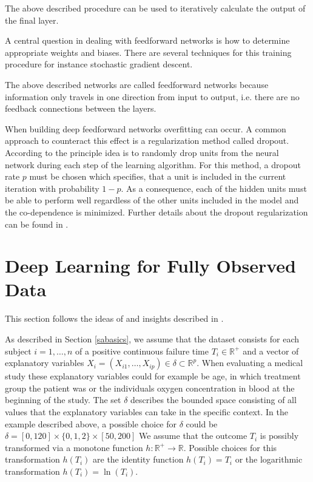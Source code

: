 \documentclass[12pt, a4paper]{scrartcl}
\theoremstyle{definition}
\theoremstyle{plain}
\numberwithin{equation}{section}
\numberwithin{figure}{section}
\numberwithin{table}{section}
\begin{document}
	The above described procedure can be used to iteratively calculate the output of the final layer.
	
	A central question in dealing with feedforward networks is how to determine appropriate weights and biases.
	There are several techniques for this training procedure for instance stochastic gradient descent.
	
	The above described networks are called feedforward networks because information only travels in one direction from input to output, i.e. there are no feedback connections between the layers.
	
	When building deep feedforward networks overfitting can occur.
	A common approach to counteract this effect is a regularization method called dropout.
	According to \citet*{dropout} the principle idea is to randomly drop units from the neural network during each step of the learning algorithm.
	For this method, a dropout rate $p$ must be chosen which specifies, that a unit is included in the current iteration with probability $1-p$.
	As a consequence, each of the hidden units must be able to perform well regardless of the other units included in the model and the co-dependence is minimized.
	Further details about the dropout regularization can be found in \citet*{dropout}.
	
	
	\newpage
	
	\section{Deep Learning for Fully Observed Data} \label{uncensored}
	This section follows the ideas of \citet*{basearticle} and insights described in \citet*{deeplbook}.
	
	As described in Section \ref{sabasics}, we assume that the dataset consists for each subject $i = 1,\dots,n$ of a positive continuous failure time $T_i \in \mathbb{R}^+$ and a vector of explanatory variables $X_i = (X_{i1}, \dots , X_{ip}) \in \delta \subset \mathbb{R}^p$.
	When evaluating a medical study these explanatory variables could for example be age, in which treatment group the patient was or the individuals oxygen concentration in blood at the beginning of the study.
	The set $\delta$ describes the bounded space consisting of all values that the explanatory variables can take in the specific context.
	In the example described above, a possible choice for $\delta$ could be $\delta = [0, 120] \times \{0,1,2\} \times [50, 200]$
	We assume that the outcome $T_i$ is possibly transformed via a monotone function $h: \mathbb{R}^+ \rightarrow \mathbb{R}$.
	Possible choices for this transformation $h(T_i)$ are the identity function $h(T_i)=T_i$ or the logarithmic transformation $h(T_i)= \ln (T_i)$.
	
\end{document}
